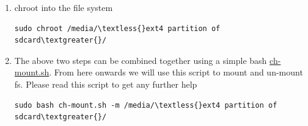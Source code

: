 \documentclass[letterpaper,10pt,english]{sphinxmanual}
\begin{document}
\begin{enumerate}
\item {} 
chroot into the file system

\begin{Verbatim}[commandchars=\\\{\}]
sudo chroot /media/\textless{}ext4 partition of sdcard\textgreater{}/
\end{Verbatim}

\item {} 
The above two steps can be combined together using a simple bash
\href{https://github.com/psachin/bash\_scripts/blob/master/ch-mount.sh}{ch-mount.sh}. From
here onwards we will use this script to mount and un-mount
fs. Please read this script to get any further help

\begin{Verbatim}[commandchars=\\\{\}]
sudo bash ch-mount.sh -m /media/\textless{}ext4 partition of sdcard\textgreater{}/
\end{Verbatim}

\end{enumerate}
\end{document}
